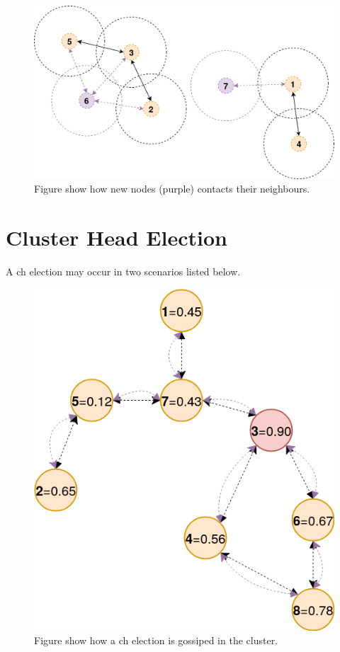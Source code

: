 \documentclass[USenglish]{uit-thesis}
\begin{document}
\begin{figure}
\centering
\includegraphics[width=\textwidth]{contactNewNeighbour.png}
\caption{Figure show how new nodes (purple) contacts their neighbours.}
\label{fig:contactNeighbour}
\end{figure}


\section{Cluster Head Election}
A \gls{ch} election may occur in two scenarios listed below.

\begin{figure}
\centering
\includegraphics[width=\textwidth]{leaderElection.png}
\caption{Figure show how a \gls{ch} election is gossiped in the cluster.}
\label{fig:leaderElection}
\end{figure}
\end{document}
